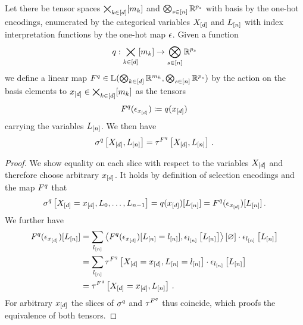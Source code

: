 \begin{theorem}
    \label{the:selectionToBasisEncoding}
    Let there be tensor spaces $\bigtimes_{k\in[d]}[m_{k}]$ and $\bigotimes_{s\in[n]}\mathbb{R}^{p_{s}}$ with basis by the one-hot encodings, enumerated by the categorical variables $X_{[d]}$ and $L_{[n]}$ with index interpretation functions by the one-hot map $\epsilon$.
    Given a function
    \begin{align*}
        q : \bigtimes_{k\in[d]}[m_{k}] \rightarrow \bigotimes_{s\in[n]}\mathbb{R}^{p_{s}}
    \end{align*}
    we define a linear map $F^{q}\in\mathbb{L}(\bigotimes_{k\in[d]} \mathbb{R}^{m_{k}},\bigotimes_{s\in[n]}\mathbb{R}^{p_{s}})$ by the action on the basis elements to $x_{[d]}\in\bigtimes_{k\in[d]}[m_{k}]$ as the tensors %
    \begin{align*}
        F^{q}(\epsilon_{x_{[d]}}) \coloneqq q(x_{[d]}) \,
    \end{align*}
    carrying the variables $L_{[n]}$.
    We then have
    \begin{align*}
        \sigma^{q}\left[X_{[d]},L_{[n]}\right]
        = \tau^{F^{q}}\left[X_{[d]},L_{[n]}\right] \, .
    \end{align*}
\end{theorem}
\begin{proof}
    We show equality on each slice with respect to the variables $X_{[d]}$ and therefore choose arbitrary $x_{[d]}$. %
    It holds by definition of selection encodings and the map $F^{q}$ that
    \begin{align*}
        \sigma^{q}\left[X_{[d]}=x_{[d]},L_{0},\ldots,L_{n-1}\right]
        = q(x_{[d]})[L_{[n]}]
        = F^{q}(\epsilon_{x_{[d]}})[L_{[n]}] \, .
    \end{align*}
    We further have
    \begin{align*}
        F^{q}(\epsilon_{x_{[d]}})[L_{[n]}]
        &= \sum_{l_{[n]}} \left\langle F^{q}(\epsilon_{x_{[d]}})[L_{[n]}=l_{[n]}],\epsilon_{l_{[n]}}\left[L_{[n]}\right]\right\rangle \left[ \varnothing \right] \cdot \epsilon_{l_{[n]}}\left[L_{[n]}\right] \\
        &= \sum_{l_{[n]}} \tau^{F^{q}}\left[X_{[d]}=x_{[d]},L_{[n]}=l_{[n]}\right] \cdot \epsilon_{l_{[n]}}\left[L_{[n]}\right] \\
        &= \tau^{F^{q}}\left[X_{[d]}=x_{[d]},L_{[n]}\right] \, .
    \end{align*}
    For arbitrary $x_{[d]}$ the slices of $\sigma^{q}$ and $\tau^{F^{q}}$ thus coincide, which proofs the equivalence of both tensors.
\end{proof}

